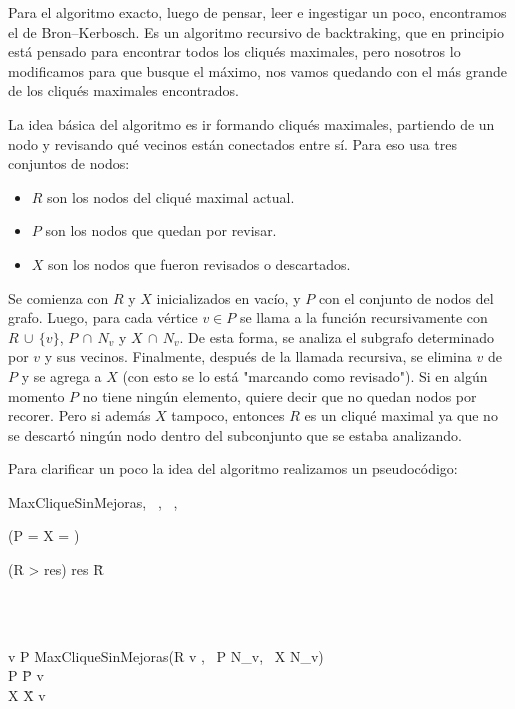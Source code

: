Para el algoritmo exacto, luego de pensar, leer e ingestigar un poco, encontramos el de Bron–Kerbosch. Es un algoritmo recursivo de backtraking, que en principio está pensado para encontrar todos los cliqués maximales, pero nosotros lo modificamos para que busque el máximo, nos vamos quedando con el más grande de los cliqués maximales encontrados.

La idea básica del algoritmo es ir formando cliqués maximales, partiendo de un nodo y revisando qué vecinos están conectados entre sí. Para eso usa tres conjuntos de nodos:
\begin{itemize}
\item $R$ son los nodos del cliqué maximal actual.
\item $P$ son los nodos que quedan por revisar.
\item $X$ son los nodos que fueron revisados o descartados.
\end{itemize}

Se comienza con $R$ y $X$ inicializados en vacío, y $P$ con el conjunto de nodos del grafo. Luego, para cada vértice $v \in P$ se llama a la función recursivamente con $R \, \cup \, \lbrace v \rbrace$, $P \, \cap \, N_{v}$ y $X \, \cap \, N_{v}$. De esta forma, se analiza el subgrafo determinado por $v$ y sus vecinos. Finalmente, después de la llamada recursiva, se elimina $v$ de $P$ y se agrega a $X$ (con esto se lo está "marcando como revisado"). Si en algún momento $P$ no tiene ningún elemento, quiere decir que no quedan nodos por recorer. Pero si además $X$ tampoco, entonces $R$ es un cliqué maximal ya que no se descartó ningún nodo dentro del subconjunto que se estaba analizando.

Para clarificar un poco la idea del algoritmo realizamos un pseudocódigo:\\

\begin{algorithm}{MaxCliqueSinMejoras}{, \, , \, , \, }{}
	\begin{IF}{(P = \emptyset \wedge X = \emptyset)}
		\begin{IF}{(\sharp R > \sharp res)}
    			res \= R
		\end{IF}
	\end{IF}\\
	\\
    \begin{FOR}{v \in P}
    	MaxCliqueSinMejoras(R \cup \lbrace v \rbrace, \, P \cap N_{v}, \, X \cap N_{v}) \\
		P \= P \setminus \lbrace v \rbrace\\
		X \= X \cup \lbrace v \rbrace
	\end{FOR}
\end{algorithm}

